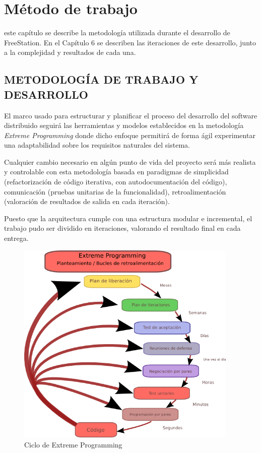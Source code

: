 \cleardoublepage
\chapter{Método de trabajo}
\thispagestyle{fancy}

 este capítulo se describe la metodología utilizada durante el desarrollo
de FreeStation. En el Capítulo 6 se describen las iteraciones de este
desarrollo, junto a la complejidad y resultados de cada una.

\section{\uppercase{Metodología de trabajo y desarrollo}}

El marco usado para estructurar y planificar el proceso del desarrollo del
software distribuido seguirá las herramientas y modelos establecidos en la
metodología \emph{Extreme Programming}\cite{Bec01} donde dicho enfoque permitirá
de forma ágil experimentar una adaptabilidad sobre los requisitos naturales del
sistema.

Cualquier cambio necesario en algún punto de vida del proyecto será más
realista y controlable con esta metodología
basada en paradigmas de simplicidad (refactorización de código iterativa,
con autodocumentación del código),
comunicación (pruebas unitarias de la funcionalidad), retroalimentación
(valoración de resultados de salida en cada iteración).

Puesto que la arquitectura cumple con una estructura modular e incremental, el
trabajo pudo ser dividido en iteraciones, valorando el resultado final en cada
entrega.

\begin{figure}[ht]
    \begin{center}
        \includegraphics[width=400px]{src/img/extreme-programing-graph.png}
        \caption[Ciclo de Extreme Programming] {Ciclo de Extreme Programming}
    \end{center}
\end{figure}

